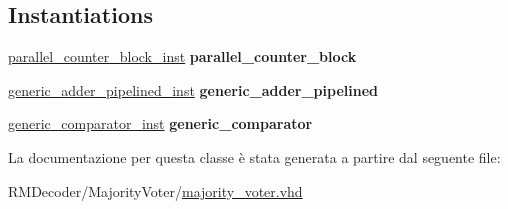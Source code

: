 \subsection*{Instantiations}
 \begin{DoxyCompactItemize}
\item 
\hypertarget{classmajority__voter_1_1_structural_a5e77302ec83f3e25baa98eb8df9306c6}{\hyperlink{classmajority__voter_1_1_structural_a5e77302ec83f3e25baa98eb8df9306c6}{parallel\+\_\+counter\+\_\+block\+\_\+inst}  {\bfseries parallel\+\_\+counter\+\_\+block}   }\label{classmajority__voter_1_1_structural_a5e77302ec83f3e25baa98eb8df9306c6}

\item 
\hypertarget{classmajority__voter_1_1_structural_a222f5bd9c172e3ec0919a452db5eef5d}{\hyperlink{classmajority__voter_1_1_structural_a222f5bd9c172e3ec0919a452db5eef5d}{generic\+\_\+adder\+\_\+pipelined\+\_\+inst}  {\bfseries generic\+\_\+adder\+\_\+pipelined}   }\label{classmajority__voter_1_1_structural_a222f5bd9c172e3ec0919a452db5eef5d}

\item 
\hypertarget{classmajority__voter_1_1_structural_a2626b85703e1997c5fa27d370bf4e51e}{\hyperlink{classmajority__voter_1_1_structural_a2626b85703e1997c5fa27d370bf4e51e}{generic\+\_\+comparator\+\_\+inst}  {\bfseries generic\+\_\+comparator}   }\label{classmajority__voter_1_1_structural_a2626b85703e1997c5fa27d370bf4e51e}

\end{DoxyCompactItemize}


La documentazione per questa classe è stata generata a partire dal seguente file\+:\begin{DoxyCompactItemize}
\item 
R\+M\+Decoder/\+Majority\+Voter/\hyperlink{majority__voter_8vhd}{majority\+\_\+voter.\+vhd}\end{DoxyCompactItemize}
